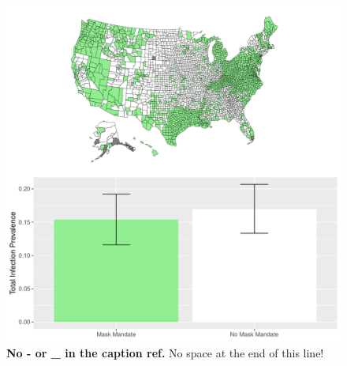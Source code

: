 \documentclass[
  12pt,
]{article}
\begin{document}
\begin{figure}[H]

{\centering \includegraphics{Final-Manuscript_files/figure-latex/figS1-1} 

}

\caption{\textbf{No - or \_ in the caption ref.} No space at the end of this line!}\label{fig:figS1}
\end{figure}
\end{document}
